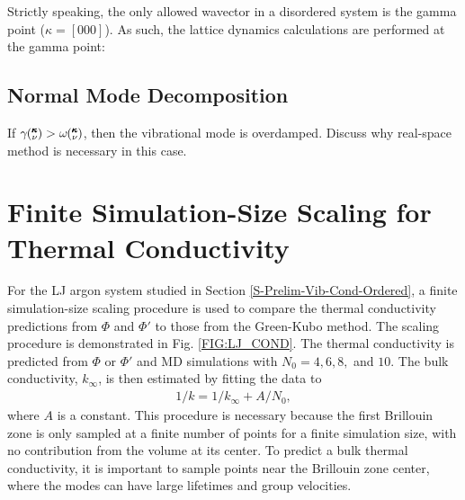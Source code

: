\documentclass[aps,prb,twocolumn,superscriptaddress,preprintnumbers,amsmath,amssymb,floatfix]{revtex4}
\newcommand{\kv}{\mspace{-4.0mu}\left(\mspace{-8.0mu}
\begin{smallmatrix}&\pmb{\kappa} \\&\nu\end{smallmatrix}
\mspace{-3.0mu}\right)}
\begin{document}
Strictly speaking, the only allowed wavector in a disordered system is the 
gamma point ($\kappa = [0 0 0]$). As such, the lattice dynamics calculations 
are performed at the gamma point:

\subsection{\label{S:Lifetimes:}Normal Mode Decomposition}
If $\gamma \kv > \omega \kv$, then the vibrational mode is overdamped.  
Discuss why real-space method is necessary in this case.
\section{\label{A-Finite-Sim}Finite Simulation-Size Scaling for Thermal 
Conductivity}
For the LJ argon system studied in Section \ref{S-Prelim-Vib-Cond-Ordered}, 
a finite simulation-size scaling procedure\cite{turney2009a,He2011a} is 
used to compare the thermal conductivity predictions from $\Phi$ and $\Phi'$ 
to those from the Green-Kubo method. The scaling procedure is demonstrated in 
Fig$.$ \ref{FIG:LJ_COND}. The thermal conductivity is predicted from $\Phi$ 
or $\Phi'$ and MD simulations with $N_0 = 4,6,8,$ and $10$. The bulk 
conductivity, $k_{\infty}$, is then estimated by fitting the data to
\begin{equation}\label{k_size}
\begin{split}
1/k = 1/k_{\infty} + A/N_0,
\end{split}
\end{equation}
where $A$ is a constant. This procedure is necessary because the first 
Brillouin zone is only sampled at a finite number of points for a finite 
simulation size, with no contribution from the volume at its center. To 
predict a bulk thermal conductivity, it is important to sample points near 
the Brillouin zone center, where the modes can have large lifetimes and 
group velocities.\cite{turney2009a,sellan2010b} 


\clearpage


\end{document}
